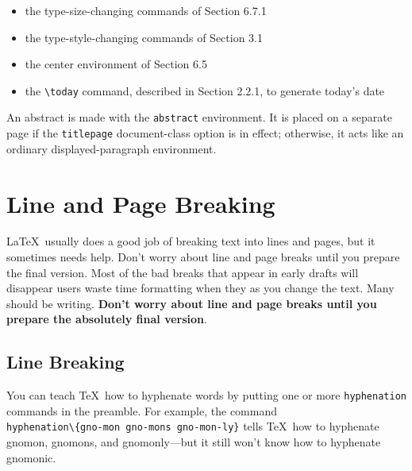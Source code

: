 \documentclass{article}
\begin{document}
\begin{itemize}
  \item the type-size-changing commands of Section 6.7.1
  \item the type-style-changing commands of Section 3.1
  \item the center environment of Section 6.5
  \item the \verb:\today: command, described in Section 2.2.1, to generate today's date
\end{itemize}

An abstract is made with the \texttt{abstract} environment. It is placed on a separate page if
the \texttt{titlepage} document-class option is in effect; otherwise, it acts like an ordinary
displayed-paragraph environment.


\section{Line and Page Breaking}

\LaTeX\ usually does a good job of breaking text into lines and pages, but it sometimes needs help.
Don't worry about line and page breaks until you prepare the final version. Most of the bad breaks
that appear in early drafts will disappear users waste time formatting when they as you change the
text. Many should be writing. 
\textbf{Don't worry about line and page breaks until you prepare the absolutely final version}.

\subsection{Line Breaking}\label{sub-line-break}

You can teach \TeX\ how to hyphenate words by putting one or more \verb:hyphenation: commands in
the preamble. For example, the command \\
\verb:hyphenation\{gno-mon gno-mons gno-mon-ly}: tells \TeX\ how to hyphenate 
gnomon, gnomons, and gnomonly---but it still won't know how to hyphenate 
gnomonic.
\end{document}
